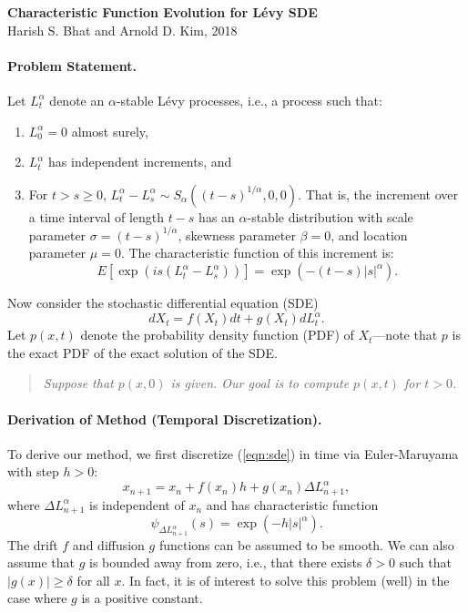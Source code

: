 \documentclass[11pt,letterpaper]{article}
\begin{document}
\begin{center}
\textbf{Characteristic Function Evolution for L\'{e}vy SDE}\\
Harish S. Bhat and Arnold D. Kim, 2018
\end{center}

\paragraph{Problem Statement.} Let $L_t^{\alpha}$ denote an $\alpha$-stable L\'{e}vy processes, i.e., a process such that:
\begin{enumerate}
\item $L_0^\alpha = 0$ almost surely,
\item $L_t^\alpha$ has independent increments, and
\item For $t > s \geq 0$, $L_t^\alpha - L_s^\alpha \sim S_\alpha((t-s)^{1/\alpha},0,0)$.  That is, the increment over a time interval of length $t-s$ has an $\alpha$-stable distribution with scale parameter $\sigma = (t-s)^{1/\alpha}$, skewness parameter $\beta=0$, and location parameter $\mu=0$.  The characteristic function of this increment is:
\begin{equation}
\label{eqn:cfinc}
E[\exp(i s (L_t^\alpha - L_s^\alpha))] = \exp(-(t-s) |s|^\alpha).
\end{equation}
\end{enumerate}

\noindent Now consider the stochastic differential equation (SDE)
\begin{equation}
\label{eqn:sde}
dX_t = f(X_t) dt + g(X_t) dL_t^{\alpha}.
\end{equation}
Let $p(x,t)$ denote the probability density function (PDF) of $X_t$---note that $p$ is the exact PDF of the exact solution of the SDE.

\begin{quote}
\emph{Suppose that $p(x,0)$ is given.  Our goal is to compute $p(x,t)$ for $t > 0$.}
\end{quote}

\paragraph{Derivation of Method (Temporal Discretization).} To derive our method, we first discretize (\ref{eqn:sde}) in time via Euler-Maruyama with step $h > 0$:
\begin{equation}
\label{eqn:em}
x_{n+1} = x_n + f(x_{n}) h + g(x_{n}) \Delta L_{n+1}^{\alpha},
\end{equation}
where $\Delta L_{n+1}^{\alpha}$ is independent of $x_n$ and has characteristic function
\begin{equation}
\label{eqn:emchar}
\psi_{\Delta L^{\alpha}_{n+1}}(s) = \exp(- h |s|^\alpha).
\end{equation}
The drift $f$ and diffusion $g$ functions can be assumed to be smooth.  We can also assume that $g$ is bounded away from zero, i.e., that there exists $\delta > 0$ such that $|g(x)| \geq \delta$ for all $x$.  In fact, it is of interest to solve this problem (well) in the case where $g$ is a positive constant.
\end{document}
